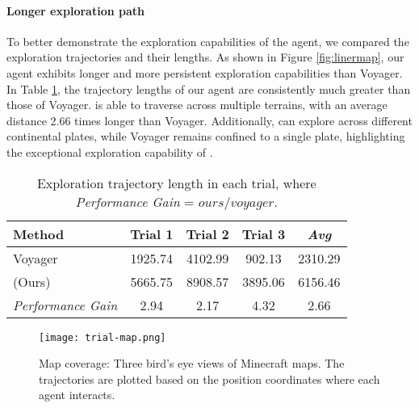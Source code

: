 \paragraph{Longer exploration path} To better demonstrate the exploration capabilities of the agent, we compared the exploration trajectories and their lengths. As shown in Figure \ref{fig:linermap}, our agent exhibits longer and more persistent exploration capabilities than Voyager. In Table \ref{tab:length}, the trajectory lengths of our agent are consistently much greater than those of Voyager. {\ours}is able to traverse across multiple terrains, with an average distance 2.66 times longer than Voyager. Additionally, {\ours} can explore across different continental plates, while Voyager remains confined to a single plate, highlighting the exceptional exploration capability of {\ours}.

\begin{table}[H]
\caption{Exploration trajectory length in each trial, where \textit{Performance Gain} = $\textit{ours}/\textit{voyager}$.}
\label{tab:length}
\setlength{\tabcolsep}{12pt} %
\begin{center}
\begin{small}
\begin{sc}
\begin{tabular}{lcccc} %
\toprule
\textnormal{\textbf{Method}} & \textnormal{\textbf{Trial 1}} & \textnormal{\textbf{Trial 2}} & \textnormal{\textbf{Trial 3}} & \textnormal{\textbf{\textit{Avg}}}\\
\midrule
\normalfont Voyager     & 1925.74  & 4102.99  & 902.13  & 2310.29   \\
\normalfont {\ours}(Ours)  & 5665.75  & 8908.57  & 3895.06 & 6156.46  \\
\midrule
\normalfont \textit{Performance Gain} & 2.94  & 2.17   & 4.32    & 2.66 \\
\bottomrule
\end{tabular}
\end{sc}
\end{small}
\end{center}
\vskip -0.1in
\end{table}


\vskip -0.2in
\begin{figure}[H]
\vskip 0.2in
\begin{center}
\centerline{\texttt{[image: trial-map.png]}}
\caption{Map coverage: Three bird’s eye views of Minecraft maps. The trajectories are plotted based on the position coordinates where each agent interacts.}
\label{fig:trialmap}
\end{center}
\vskip -0.3in
\end{figure}


